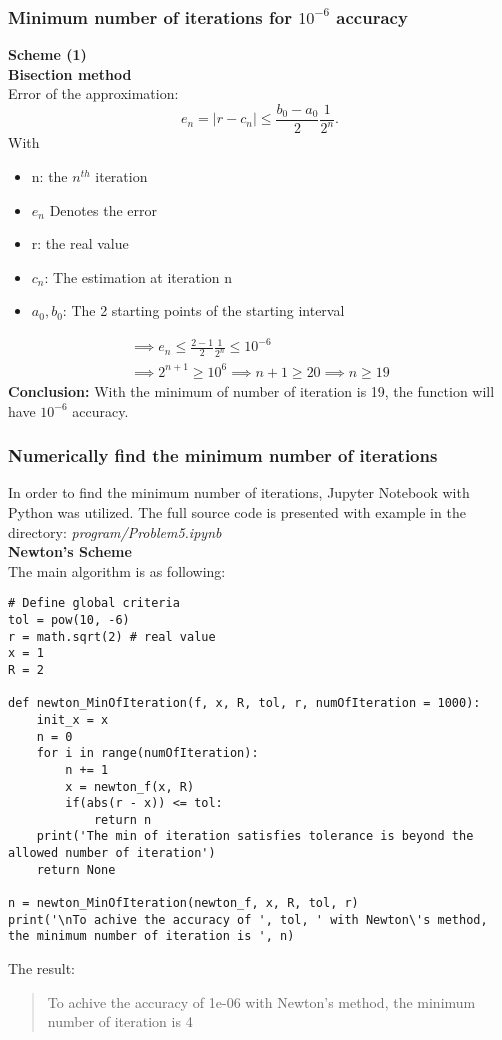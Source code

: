 \subsubsection{Minimum number of iterations for $10^{-6}$ accuracy}
\textbf{Scheme (1)}\\
\textbf{Bisection method} \\
Error of the approximation: 
\[
    e_{n} = |r - c_{n}| \le \frac{b_{0} - a_{0}}{2}\frac{1}{2^{n}}
.\] 
With
\begin{itemize}
    \item n: the $n^{th}$ iteration
    \item $e_{n}$ Denotes the error
    \item r: the real value
    \item  $c_{n}$: The estimation at iteration n
    \item  $a_{0}, b_{0}$: The 2 starting points of the starting interval
\end{itemize}

\begin{align*}
    \implies e_{n} \le \frac{2-1}{2} \frac{1}{2^{n}} \le 10^{-6} \\
    \implies 2^{n+1} \ge 10^{6}
    \implies n + 1 \ge 20
    \implies n \ge  19
\end{align*}
\textbf{Conclusion:} With the minimum of number of iteration is 19, the function will have $10^{-6}$ accuracy.

\subsubsection{Numerically find the minimum number of iterations}
In order to find the minimum number of iterations, Jupyter Notebook with Python was utilized. The full source code is presented with example in the directory: \textit{program/Problem5.ipynb} \\
\textbf{Newton's Scheme}\\
The main algorithm is as following:
\begin{lstlisting}
# Define global criteria
tol = pow(10, -6)
r = math.sqrt(2) # real value
x = 1
R = 2

def newton_MinOfIteration(f, x, R, tol, r, numOfIteration = 1000):
    init_x = x
    n = 0
    for i in range(numOfIteration):
        n += 1
        x = newton_f(x, R)
        if(abs(r - x)) <= tol:
            return n
    print('The min of iteration satisfies tolerance is beyond the allowed number of iteration')
    return None

n = newton_MinOfIteration(newton_f, x, R, tol, r)
print('\nTo achive the accuracy of ', tol, ' with Newton\'s method, the minimum number of iteration is ', n)
\end{lstlisting}
The result:
\begin{quote}
To achive the accuracy of  1e-06  with Newton's method, the minimum number of iteration is  4
\end{quote}

